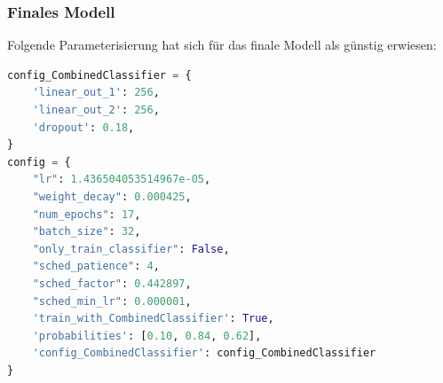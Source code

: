 \documentclass[12pt,oneside]{article}
\begin{document}
  
	    \subsubsection{Finales Modell}
	    Folgende Parameterisierung hat sich für das finale Modell als günstig erwiesen:
\begin{lstlisting}[language=Python, basicstyle=\small\ttfamily]
config_CombinedClassifier = {
	'linear_out_1': 256,
	'linear_out_2': 256,
	'dropout': 0.18,
}
config = {
	"lr": 1.436504053514967e-05,
	"weight_decay": 0.000425,
	"num_epochs": 17,
	"batch_size": 32,
	"only_train_classifier": False,
	"sched_patience": 4,
	"sched_factor": 0.442897,
	"sched_min_lr": 0.000001,
	'train_with_CombinedClassifier': True,
	'probabilities': [0.10, 0.84, 0.62],
	'config_CombinedClassifier': config_CombinedClassifier
}
\end{lstlisting}
  
\end{document}

